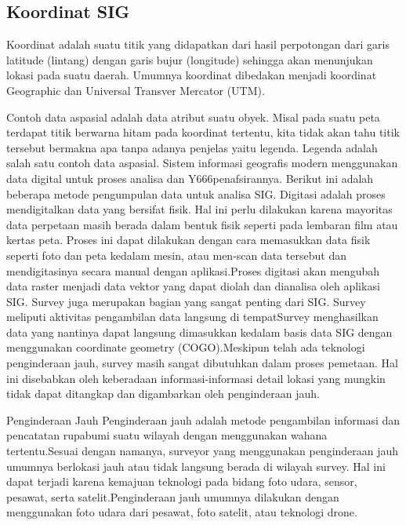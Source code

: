 \subsection{Koordinat SIG}
Koordinat adalah suatu titik yang didapatkan dari hasil perpotongan dari garis latitude (lintang) dengan garis bujur (longitude) sehingga akan menunjukan lokasi pada suatu daerah. Umumnya koordinat dibedakan menjadi koordinat Geographic dan Universal Transver Mercator (UTM). 

Contoh data aspasial adalah data atribut suatu obyek. Misal pada suatu peta terdapat titik berwarna hitam pada koordinat tertentu, kita tidak akan tahu titik tersebut bermakna apa tanpa adanya penjelas yaitu legenda. Legenda adalah salah satu contoh data aspasial.
Sistem informasi geografis modern menggunakan data digital untuk proses analisa dan Y666penafsirannya. Berikut ini adalah beberapa metode pengumpulan data untuk analisa SIG.
Digitasi adalah proses mendigitalkan data yang bersifat fisik. Hal ini perlu dilakukan karena mayoritas data perpetaan masih berada dalam bentuk fisik seperti pada lembaran film atau kertas peta.
Proses ini dapat dilakukan dengan cara memasukkan data fisik seperti foto dan peta kedalam mesin, atau men-scan data tersebut dan mendigitasinya secara manual dengan aplikasi.Proses digitasi akan mengubah data raster menjadi data vektor yang dapat diolah dan dianalisa oleh aplikasi SIG.
Survey juga merupakan bagian yang sangat penting dari SIG. Survey meliputi aktivitas pengambilan data langsung di tempatSurvey menghasilkan data yang nantinya dapat langsung dimasukkan kedalam basis data SIG dengan menggunakan coordinate geometry (COGO).Meskipun telah ada teknologi penginderaan jauh, survey masih sangat dibutuhkan dalam proses pemetaan. Hal ini disebabkan oleh keberadaan informasi-informasi detail lokasi yang mungkin tidak dapat ditangkap dan digambarkan oleh penginderaan jauh.
 
Penginderaan Jauh
Penginderaan jauh adalah metode pengambilan informasi dan pencatatan rupabumi suatu wilayah dengan menggunakan wahana tertentu.Sesuai dengan namanya, surveyor yang menggunakan penginderaan jauh umumnya berlokasi jauh atau tidak langsung berada di wilayah survey. Hal ini dapat terjadi karena kemajuan teknologi pada bidang foto udara, sensor, pesawat, serta satelit.Penginderaan jauh umumnya dilakukan dengan menggunakan foto udara dari pesawat, foto satelit, atau teknologi drone.

